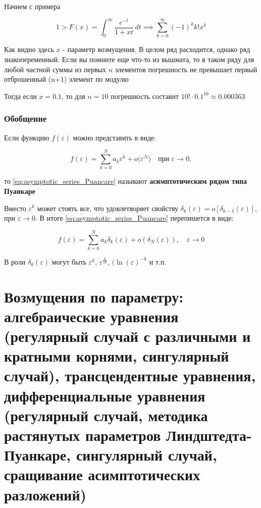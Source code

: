 	Начнем с примера
	
	\begin{equation}
		1 > F(x) = \int_0^\infty \frac{e^{-t}}{1 + xt} \, dt \implies \sum_{k=0}^\infty (-1)^k k! x^k
	\end{equation}
	
	Как видно здесь $x$ - параметр возмущения. В целом ряд расходится, однако ряд знакопеременный. Если вы помните еще что-то из вышмата, то в таком ряду для любой частной суммы из первых $n$ элементов погрешность не превышает первый отброшенный (n+1) элемент по модулю
	
	Тогда если $x = 0.1$, то для $n=10$ погрешность составит $10!\cdot0.1^{10} \approx 0.000363$
	
	\subsubsection{Обобщение}
	
	Если функцию $f(\varepsilon)$ можно представить в виде:
	
	\begin{equation}
		f(\varepsilon) = \sum_{k=0}^N a_k \varepsilon^k + o\bigl(\varepsilon^N\bigr) \quad \text{при } \varepsilon \to 0,
		\label{eq:asymptotic_series_Puancare}
	\end{equation}
	
	то \eqref{eq:asymptotic_series_Puancare} называют \textbf{асимптотическим рядом типа Пуанкаре}
	
	\vspace{1em}
	
	Вместо $\varepsilon^k$ может стоять все, что удовлетворяет свойству $\delta_k(\varepsilon) = o\left[\delta_{k-1}(\varepsilon)\right]$, при $\varepsilon \to 0$. В итоге \eqref{eq:asymptotic_series_Puancare} перепишется в виде:
	
	\begin{equation}
		f(\varepsilon) = \sum_{k=0}^{N} a_k \delta_k(\varepsilon) + o(\delta_N(\varepsilon)), \quad \varepsilon \to 0
	\end{equation}
	
	В роли $\delta_k(\varepsilon)$ могут быть $\varepsilon^k$, $\varepsilon^{\frac k {10}}$, $(\ln(\varepsilon)^{-k}$ и т.п.
	
	\newpage
	
	\section{Возмущения по параметру: алгебраические уравнения (регулярный случай с различными и кратными корнями, сингулярный случай), трансцендентные уравнения, дифференциальные уравнения (регулярный случай, методика растянутых параметров Линдштедта-Пуанкаре, сингулярный случай, сращивание асимптотических разложений)}
	
